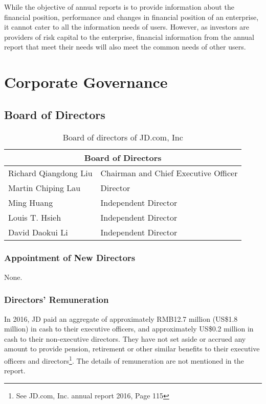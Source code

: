 While the objective of annual reports is to provide information about the financial position, performance and changes in financial position of an enterprise, it cannot cater to all the information needs of users. However, as investors are providers of risk capital to the enterprise, financial information from the annual report that meet their needs will also meet the common needs of other users.

\section{Corporate Governance}
\subsection{Board of Directors}

\begin{table}[H]	
\begin{center}
\begin{tabular}{ l|l }
	\hline
	\multicolumn{2}{c}{\textbf{Board of Directors}} \\
	\hline
	Richard Qiangdong Liu	&		Chairman and Chief Executive Officer \\
	\rowcolor[gray]{.95}
	Martin Chiping Lau		& 		Director\\
	Ming Huang				&		Independent Director \\
	\rowcolor[gray]{.95}
	Louis T. Hsieh			&		Independent Director \\
	David Daokui Li			&		Independent Director \\
	\hline
\end{tabular}
\end{center}
\caption{Board of directors of JD.com, Inc}\label{table:1}
\end{table}


	
 
\subsubsection{Appointment of New Directors}
None.

\subsubsection{Directors’ Remuneration}
In 2016, JD paid an aggregate of approximately RMB12.7 million (US\$1.8 million) in cash to their executive officers, and approximately US\$0.2 million in cash to their non-executive directors. They have not set aside or accrued any amount to provide pension, retirement or other similar benefits to their executive officers and directors\footnote{See JD.com, Inc. annual report 2016, Page 115}.
The details of remuneration are not mentioned in the report.


